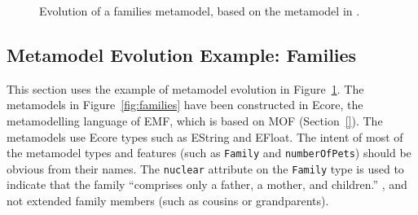 \begin{figure}[htbp]
	\centering
	\caption{Evolution of a families metamodel, based on the metamodel in \cite{hutn}.}
\label{fig:families_mms}
\end{figure}

\subsection{Metamodel Evolution Example: Families}
\label{subsec:families_example}
This section uses the example of metamodel evolution in Figure~\ref{fig:families_mms}. The metamodels in Figure~\ref{fig:families} have been constructed in Ecore, the metamodelling language of EMF, which is based on MOF (Section~\ref{}). The metamodels use Ecore types such as EString and EFloat. The intent of most of the metamodel types and features (such as \texttt{Fa\-mi\-ly} and \texttt{nu\-mb\-erOfPe\-ts}) should be obvious from their names. The \texttt{nu\-cl\-e\-ar} attribute on the \texttt{Fa\-mi\-ly} type is used to indicate that the family ``comprises only a father, a mother, and children.'' \cite{nucleardef}, and not extended family members (such as cousins or grandparents).

